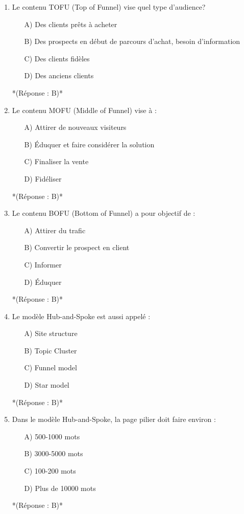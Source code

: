 \documentclass[12pt,a4paper,twoside]{report}
\begin{document}
\begin{enumerate}
\item Le contenu TOFU (Top of Funnel) vise quel type d'audience?
\begin{itemize}
\item[A)] Des clients prêts à acheter
\item[B)] Des prospects en début de parcours d'achat, besoin d'information
\item[C)] Des clients fidèles
\item[D)] Des anciens clients
\end{itemize}
*(Réponse : B)*

\item Le contenu MOFU (Middle of Funnel) vise à :
\begin{itemize}
\item[A)] Attirer de nouveaux visiteurs
\item[B)] Éduquer et faire considérer la solution
\item[C)] Finaliser la vente
\item[D)] Fidéliser
\end{itemize}
*(Réponse : B)*

\item Le contenu BOFU (Bottom of Funnel) a pour objectif de :
\begin{itemize}
\item[A)] Attirer du trafic
\item[B)] Convertir le prospect en client
\item[C)] Informer
\item[D)] Éduquer
\end{itemize}
*(Réponse : B)*

\item Le modèle Hub-and-Spoke est aussi appelé :
\begin{itemize}
\item[A)] Site structure
\item[B)] Topic Cluster
\item[C)] Funnel model
\item[D)] Star model
\end{itemize}
*(Réponse : B)*

\item Dans le modèle Hub-and-Spoke, la page pilier doit faire environ :
\begin{itemize}
\item[A)] 500-1000 mots
\item[B)] 3000-5000 mots
\item[C)] 100-200 mots
\item[D)] Plus de 10000 mots
\end{itemize}
*(Réponse : B)*


\end{enumerate}
\end{document}
